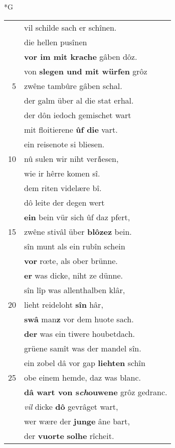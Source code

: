\documentclass[8pt,a4paper,notitlepage]{article}
\begin{document}
\newpage
\begin{table}[ht]
\begin{minipage}[t]{0.5\linewidth}
\small
\begin{center}*G
\end{center}
\begin{tabular}{rl}
 & vil schilde sach er schînen.\\ 
 & die hellen pusînen\\ 
 & \textbf{vor im mit krache} gâben dôz.\\ 
 & von \textbf{slegen und mit würfen} grôz\\ 
5 & zwêne tambûre gâben schal.\\ 
 & der galm über al die stat erhal.\\ 
 & der dôn iedoch gemischet wart\\ 
 & mit floitierene \textbf{ûf die} vart.\\ 
 & ein reisenote si bliesen.\\ 
10 & nû sulen wir niht ver\textit{l}iesen,\\ 
 & wie ir hêrre komen sî.\\ 
 & dem riten videlære bî.\\ 
 & dô leite der degen wert\\ 
 & \textbf{ein} bein vür sich ûf daz pfert,\\ 
15 & zwêne stivâl über \textbf{blôzez} bein.\\ 
 & sîn munt als ein rubîn schein\\ 
 & \textbf{vor} rœte, als ober brünne.\\ 
 & \textbf{er} was dicke, niht ze dünne.\\ 
 & sîn lîp was allenthalben klâr,\\ 
20 & lieht reideloht \textbf{sîn} hâr,\\ 
 & \textbf{swâ} man\textbf{z} vor dem huote sach.\\ 
 & \textbf{der} was ein tiwere houbetdach.\\ 
 & grüene samît was der mandel sîn.\\ 
 & ein zobel dâ vor gap \textbf{liehten} schîn\\ 
25 & obe einem hemde, daz was blanc.\\ 
 & \textbf{dâ wart von s\textit{ch}ouwene} grôz gedranc.\\ 
 & \textit{vil} dicke \textbf{dô} gevrâget wart,\\ 
 & wer wære der \textbf{junge} âne bart,\\ 
 & der \textbf{vuorte} \textbf{solhe} rîcheit.\\ 

\end{tabular}
\end{minipage}
\end{table}
\end{document}
